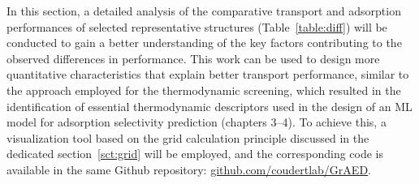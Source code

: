 \documentclass[main]{subfiles}
\begin{document}
In this section, a detailed analysis of the comparative transport and adsorption performances of selected representative structures (Table~\ref{table:diff}) will be conducted to gain a better understanding of the key factors contributing to the observed differences in performance. This work can be used to design more quantitative characteristics that explain better transport performance, similar to the approach employed for the thermodynamic screening, which resulted in the identification of essential thermodynamic descriptors used in the design of an ML model for adsorption selectivity prediction (chapters 3--4). To achieve this, a visualization tool based on the grid calculation principle discussed in the dedicated section~\ref{sct:grid} will be employed, and the corresponding code is available in the same Github repository: \url{github.com/coudertlab/GrAED}.
\end{document}
